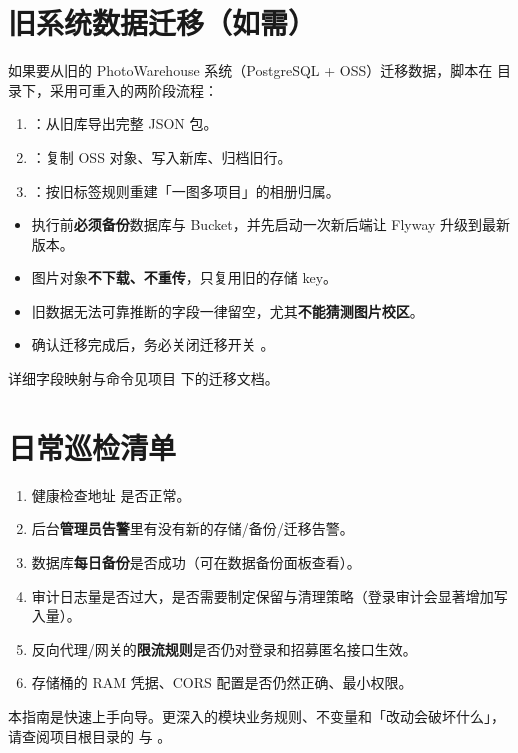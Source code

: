 \documentclass[cn,11pt,green]{elegantbook}
\begin{document}
\chapter{旧系统数据迁移（如需）}

如果要从旧的 PhotoWarehouse 系统（PostgreSQL + OSS）迁移数据，脚本在  目录下，采用可重入的两阶段流程：

\begin{enumerate}
  \item {}：从旧库导出完整 JSON 包。
  \item {}：复制 OSS 对象、写入新库、归档旧行。
  \item {}：按旧标签规则重建「一图多项目」的相册归属。
\end{enumerate}

\begin{warnbox}[迁移前后须知]
  \begin{itemize}
    \item 执行前\textbf{必须备份}数据库与 Bucket，并先启动一次新后端让 Flyway 升级到最新版本。
    \item 图片对象\textbf{不下载、不重传}，只复用旧的存储 key。
    \item 旧数据无法可靠推断的字段一律留空，尤其\textbf{不能猜测图片校区}。
    \item 确认迁移完成后，务必关闭迁移开关 。
  \end{itemize}
\end{warnbox}

详细字段映射与命令见项目  下的迁移文档。

\chapter{日常巡检清单}

\begin{stepbox}[建议定期检查]
  \begin{enumerate}
    \item 健康检查地址  是否正常。
    \item 后台\textbf{管理员告警}里有没有新的存储/备份/迁移告警。
    \item 数据库\textbf{每日备份}是否成功（可在数据备份面板查看）。
    \item 审计日志量是否过大，是否需要制定保留与清理策略（登录审计会显著增加写入量）。
    \item 反向代理/网关的\textbf{限流规则}是否仍对登录和招募匿名接口生效。
    \item 存储桶的 RAM 凭据、CORS 配置是否仍然正确、最小权限。
  \end{enumerate}
\end{stepbox}

\begin{notebox}[更多技术细节]
  本指南是快速上手向导。更深入的模块业务规则、不变量和「改动会破坏什么」，
  请查阅项目根目录的  与 。
\end{notebox}
\end{document}

